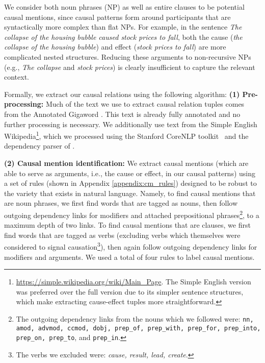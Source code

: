 We consider both noun phrases (NP) as well as entire %
clauses to be potential causal mentions, since causal patterns form around participants that are syntactically more complex than flat NPs.  
For example, in the sentence \emph{The collapse of the housing bubble caused stock prices to fall}, both the cause ({\em the collapse of the housing bubble}) and effect ({\em stock prices to fall}) are more complicated nested structures.  Reducing these arguments to non-recursive NPs (e.g., {\em The collapse} and {\em stock prices}) is clearly insufficient to capture the relevant context.

Formally, we extract our causal relations using the following algorithm:
{\flushleft \textbf{(1) Pre-processing:}} Much of the text we use to extract causal relation tuples comes from the Annotated Gigaword \citep{napoles2012annotated}.  This text is already fully annotated and no further processing is necessary.  We additionally use text from the Simple English Wikipedia\footnote{{\scriptsize \url{https://simple.wikipedia.org/wiki/Main_Page}}.  The Simple English version was preferred over the full version due to its simpler sentence structures, which make extracting cause-effect tuples more straightforward.}, which we processed using the Stanford CoreNLP toolkit~\citep{Manning:14} and the dependency parser of \citet{chen14}.

{\flushleft \textbf{(2) Causal mention identification:}} \label{step:cm} We extract causal mentions (which are able to serve as arguments, i.e., the cause or effect,  in our causal patterns) using a set of rules (shown in Appendix \ref{appendix:cm_rules}) 
designed to be robust to the variety that exists in natural language. %
Namely, to find causal mentions that are noun phrases, we first find words that are tagged as nouns, then follow outgoing dependency links for modifiers and attached prepositional phrases\footnote{The outgoing dependency links from the nouns which we followed were: \texttt{nn, amod, advmod, ccmod, dobj, prep\_of, prep\_with, prep\_for, prep\_into, prep\_on, prep\_to}, and \texttt{prep\_in}.}, to a maximum depth of two links.  To find causal mentions that are clauses, we first find words that are tagged as verbs (excluding verbs which themselves were considered to signal causation\footnote{The verbs we excluded were: \emph{cause, result, lead, create}.}), then again follow outgoing dependency links for modifiers and arguments.  We used a total of four rules to label causal mentions.%

